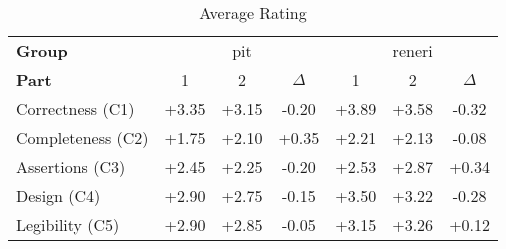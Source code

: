 \begin{sidewaystable}
\centering
\caption{Average Rating}
\label{tab:average_rating}
\begin{tabular}{lcccccc}
\toprule
\textbf{Group} & \multicolumn{3}{c}{pit} & \multicolumn{3}{c}{reneri} \\
\textbf{Part} & 1 & 2 & $\Delta$ & 1 & 2 & $\Delta$ \\
\cmidrule(lr){1-1} \cmidrule(lr){2-4} \cmidrule(lr){5-7}
Correctness (C1) & +3.35 & +3.15 & -0.20 & +3.89 & +3.58 & -0.32 \\
Completeness (C2) & +1.75 & +2.10 & +0.35 & +2.21 & +2.13 & -0.08 \\
Assertions (C3) & +2.45 & +2.25 & -0.20 & +2.53 & +2.87 & +0.34 \\
Design (C4) & +2.90 & +2.75 & -0.15 & +3.50 & +3.22 & -0.28 \\
Legibility (C5) & +2.90 & +2.85 & -0.05 & +3.15 & +3.26 & +0.12 \\
\bottomrule
\end{tabular}
\end{sidewaystable}
